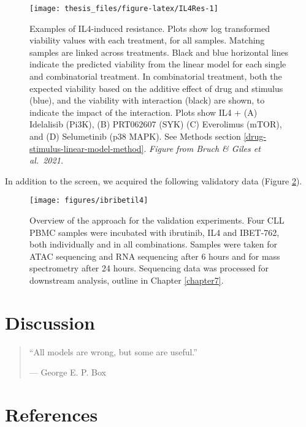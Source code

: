 \documentclass[11pt, a4paper, twosided]{book}
\begin{document}
\begin{figure}

{\centering \texttt{[image: thesis\_files/figure-latex/IL4Res-1]} 

}

\caption{Examples of IL4-induced resistance. Plots show log transformed viability values with each treatment, for all samples. Matching samples are linked across treatments. Black and blue horizontal lines indicate the predicted viability from the linear model for each single and combinatorial treatment. In combinatorial treatment, both the expected viability based on the additive effect of drug and stimulus (blue), and the viability with interaction (black) are shown, to indicate the impact of the interaction. Plots show IL4 + (A) Idelalisib (Pi3K), (B) PRT062607 (SYK) (C) Everolimus (mTOR), and (D) Selumetinib (p38 MAPK). See Methods section \ref{drug-stimulus-linear-model-method}. \emph{Figure from Bruch \& Giles et al.~2021.}}\label{fig:IL4Res}
\end{figure}
In addition to the screen, we acquired the following validatory data (Figure \ref{fig:ibribetil4}).


\begin{figure}

{\centering \texttt{[image: figures/ibribetil4]} 

}

\caption{Overview of the approach for the validation experiments. Four CLL PBMC samples were incubated with ibrutinib, IL4 and IBET-762, both individually and in all combinations. Samples were taken for ATAC sequencing and RNA sequencing after 6 hours and for mass spectrometry after 24 hours. Sequencing data was processed for downstream analysis, outline in Chapter \ref{chapter7}.}\label{fig:ibribetil4}
\end{figure}
\hypertarget{discussion-2}{%
\chapter{Discussion}\label{discussion-2}}
\begin{quote}
``All models are wrong, but some are useful.''

\hfill --- George E. P. Box
\end{quote}
\newpage

\hypertarget{references}{%
\chapter*{References}\label{references}}
\end{document}
